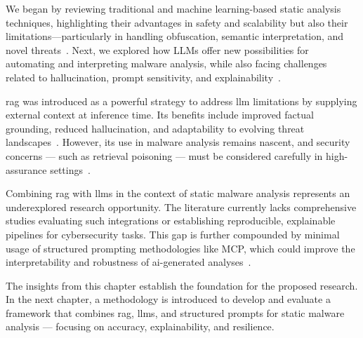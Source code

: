 We began by reviewing traditional and machine learning-based static analysis techniques,
highlighting their advantages in safety and scalability but also their limitations—particularly in
handling obfuscation, semantic interpretation, and novel threats~\cite{fedak2020fundamentals,
	gaber2024malware, cassanova2022systematic}. Next, we explored how \gls{LLMs} offer new
possibilities for automating and interpreting malware analysis, while also facing challenges
related to hallucination, prompt sensitivity, and explainability~\cite{fujii2024llm,
	nourmohammadzadeh2024llmsurvey}.

\gls{rag} was introduced as a powerful strategy to address \gls{llm} limitations
by supplying external context at inference time. Its benefits include improved
factual grounding, reduced hallucination, and adaptability to evolving threat
landscapes~\cite{lewis2020retrieval, gao2023retrieval}. However, its use in
malware analysis remains nascent, and security concerns — such as retrieval
poisoning — must be considered carefully in high-assurance settings~\cite{zou2024poisonedrag}.

Combining \gls{rag} with \glspl{llm} in the context of static malware analysis represents an
underexplored research opportunity. The literature currently lacks comprehensive studies evaluating
such integrations or establishing reproducible, explainable pipelines for cybersecurity tasks. This
gap is further compounded by minimal usage of structured prompting methodologies like MCP, which
could improve the interpretability and robustness of \gls{ai}-generated
analyses~\cite{sahoo2024systematic}.

The insights from this chapter establish the foundation for the proposed research. In the next
chapter, a methodology is introduced to develop and evaluate a framework that combines \gls{rag},
\glspl{llm}, and structured prompts for static malware analysis — focusing on accuracy,
explainability, and resilience.
